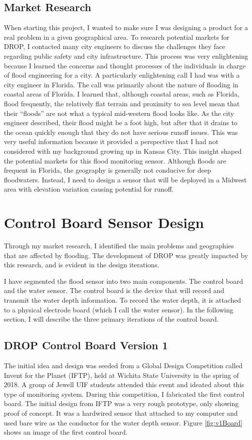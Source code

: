 \documentclass[letter]{article}
\begin{document}
\subsection{Market Research}
When starting this project, I wanted to make sure I was designing a product for a real problem in a given geographical area. To research potential markets for DROP, I contacted many city engineers to discuss the challenges they face regarding public safety and city infrastructure. This process was very enlightening because I learned the concerns and thought processes of the individuals in charge of flood engineering for a city. A particularly enlightening call I had was with a city engineer in Florida. The call was primarily about the nature of flooding in coastal areas of Florida. I learned that, although coastal areas, such as Florida, flood frequently, the relatively flat terrain and proximity to sea level mean that their ``floods'' are not what a typical mid-western flood looks like. As the city engineer described, their flood might be a foot high, but after that it drains to the ocean quickly enough that they do not have serious runoff issues. This was very useful information because it provided a perspective that I had not considered with my background growing up in Kansas City. This insight shaped the potential markets for this flood monitoring sensor. Although floods are frequent in Florida, the geography is generally not conducive for deep floodwaters. Instead, I need to design a sensor that will be deployed in a Midwest area with elevation variation causing potential for runoff.

\section{Control Board Sensor Design}
\label{sec:control board}
Through my market research, I identified the main problems and geographies that are affected by flooding. The development of DROP was greatly impacted by this research, and is evident in the design iterations.

I have segmented the flood sensor into two main components. The control board and the water sensor. The control board is the device that will record and transmit the water depth information. To record the water depth, it is attached to a physical electrode board (which I call the water sensor). In the following section, I will describe the three primary iterations of the control board. 

\subsection{DROP Control Board Version 1}
 The initial idea and design was seeded from a Global Design Competition called Invent for the Planet (IFTP), held at Wichita State University in the spring of 2018. A group of Jewell UIF students attended this event and ideated about this type of monitoring system. During this competition, I fabricated the first control board. The initial design from IFTP was a very rough prototype, only showing proof of concept. It was a hardwired sensor that attached to my computer and used bare wire as the conductor for the water depth sensor. Figure \ref{fig:v1Board} shows an image of the first control board.
 
\end{document}

